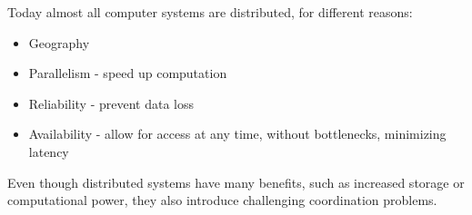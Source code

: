 Today almost all computer systems are distributed, for different reasons:
\begin{itemize}
	\item Geography
	\item Parallelism - speed up computation
	\item Reliability - prevent data loss
	\item Availability - allow for access at any time, without bottlenecks, minimizing latency
\end{itemize}

Even though distributed systems have many benefits, such as increased storage or computational power, they also introduce challenging coordination problems.